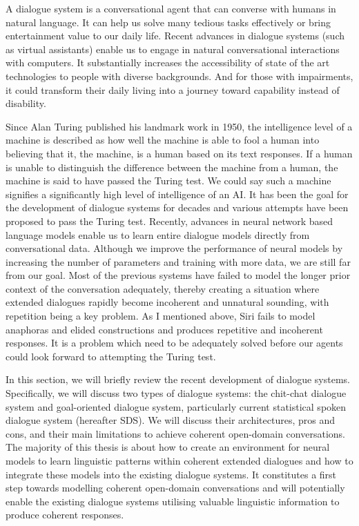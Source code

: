 \documentclass[bsc,frontabs,twoside,singlespacing,parskip,deptreport]{infthesis}     %
\begin{document}
A dialogue system is a conversational agent that can converse with humans in natural language. It can help us solve many tedious tasks effectively or bring entertainment value to our daily life. Recent advances in dialogue systems (such as virtual assistants) enable us to engage in natural conversational interactions with computers. It substantially increases the accessibility of state of the art technologies to people with diverse backgrounds. And for those with impairments, it could transform their daily living into a journey toward capability instead of disability.

Since Alan Turing published his landmark work in 1950\cite{turing1950computing}, the intelligence level of a machine is described as how well the machine is able to fool a human into believing that it, the machine, is a human based on its text responses. If a human is unable to distinguish the difference between the machine from a human, the machine is said to have passed the Turing test. We could say such a machine signifies a significantly high level of intelligence of an AI. It has been the goal for the development of dialogue systems for decades and various attempts have been proposed to pass the Turing test. Recently, advances in neural network based language models enable us to learn entire dialogue models directly from conversational data. Although we improve the performance of neural models by increasing the number of parameters and training with more data, we are still far from our goal. Most of the previous systems have failed to model the longer prior context of the conversation adequately, thereby creating a situation where extended dialogues rapidly become incoherent and unnatural sounding, with repetition being a key problem. As I mentioned above, Siri fails to model anaphoras and elided constructions and produces repetitive and incoherent responses. It is a problem which need to be adequately solved before our agents could look forward to attempting the Turing test.

In this section, we will briefly review the recent development of dialogue systems. Specifically, we will discuss two types of dialogue systems: the chit-chat dialogue system and goal-oriented dialogue system, particularly current statistical spoken dialogue system (hereafter SDS). We will discuss their architectures, pros and cons, and their main limitations to achieve coherent open-domain conversations. The majority of this thesis is about how to create an environment for neural models to learn linguistic patterns within coherent extended dialogues and how to integrate these models into the existing dialogue systems. It constitutes a first step towards modelling coherent open-domain conversations and will potentially enable the existing dialogue systems utilising valuable linguistic information to produce coherent responses.
\end{document}
